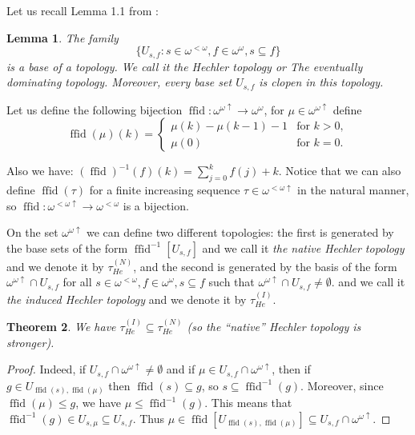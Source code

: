 \documentclass[12pt]{amsart}
\theoremstyle{plain}
\newtheorem{theorem}{Theorem}[section]
\newtheorem{lemma}[theorem]{Lemma}
\theoremstyle{definition}
\theoremstyle{remark}
\newcommand{\baire}{\omega^{\omega}}
\newcommand{\finbaire}{\omega^{<\omega}}
\newcommand{\finincrbaire}{\omega^{< \omega \uparrow}}
\newcommand{\incrbaire}{\omega^{\omega \uparrow}}
\newcommand{\Hechler}[2]{U_{#1,#2}}
\newcommand{\HechlerNative}{\tau_{\mathit{He}}^{(N)}}
\newcommand{\HechlerInduced}{\tau_{\mathit{He}}^{(I)}}
\DeclareMathOperator{\ffid}{ffid}
\begin{document}
Let us recall Lemma 1.1 from \cite{LabedzkiRepicky1995}:
\begin{lemma}
  The family
  \[\lbrace \Hechler{s}{f} \colon s \in \finbaire,
    f \in \baire, s \subseteq f\rbrace\]
  is a base of a topology.
  We call it {\it the Hechler topology} or {\it The eventually dominating topology}.
  Moreover, every base set $\Hechler{s}{f}$ is clopen in this topology.
\end{lemma}

Let us define the following bijection
$\ffid\colon\incrbaire\to\baire$, for
$\mu\in\incrbaire$ define
\[
\ffid(\mu)(k) =
\begin{cases}
\mu(k) - \mu(k - 1) - 1 & \text{for } k > 0,\\
\mu(0) & \text{for } k = 0.
\end{cases}
\]

Also we have: $(\ffid)^{-1}(f)(k) = \sum_{j=0}^k f(j) + k$.
Notice that we can also define $\ffid(\tau)$
for a finite increasing sequence $\tau\in\finincrbaire$ in the natural
manner, so $\ffid\colon\finincrbaire\to\finbaire$ is a bijection.

On the set $\incrbaire$ we can define two different topologies:
the first is generated by the base sets of the form
$\ffid^{-1}[\Hechler{s}{f}]$
and we call it {\it the native Hechler topology} and
we denote it by $\HechlerNative$, and the second is generated by the basis
of the form $\incrbaire \cap \Hechler{s}{f}$ for
all $s \in \finbaire, f \in \baire, s \subseteq f$
such that $\incrbaire \cap \Hechler{s}{f} \not= \emptyset$. 
and we call it {\it the induced Hechler topology}
and we denote it by $\HechlerInduced$.

\begin{theorem} We have
$\HechlerInduced \subseteq \HechlerNative$ (so the ``native'' Hechler
topology is stronger).
\end{theorem}
\begin{proof}
Indeed, if $\Hechler{s}{f} \cap \incrbaire \not=\emptyset$
and if $\mu \in \Hechler{s}{f} \cap \incrbaire$, then
if $g \in \Hechler{\ffid(s)}{\ffid(\mu)}$ then
$\ffid(s) \subseteq g$, so $s \subseteq \ffid^{-1}(g)$.
Moreover, since $\ffid(\mu) \leq g$, we have
$\mu \leq \ffid^{-1}(g)$. This means that
$\ffid^{-1}(g) \in \Hechler{s}{\mu} \subseteq \Hechler{s}{f}$.
Thus $\mu \in \ffid[\Hechler{\ffid(s)}{\ffid(\mu)}] \subseteq
  \Hechler{s}{f} \cap \incrbaire$.
\end{proof}
\end{document}
